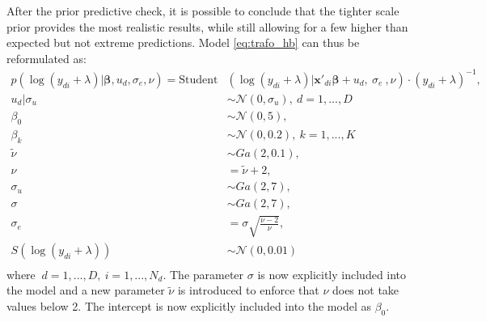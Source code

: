After the prior predictive check, it is possible to conclude that the tighter scale prior provides the most realistic results, while still allowing for a few higher than expected but not extreme predictions.
Model \ref{eq:trafo_hb} can thus be reformulated as:
\begin{equation}
    \begin{split}
        p(\log(y_{di} + \lambda) |\boldsymbol \beta, u_d, \sigma_e, \nu)   =        \text{Student}&(\log(y_{di} + \lambda)| \boldsymbol{x'}_{di} \boldsymbol \beta + u_d,\ \sigma_e\ , \nu)\cdot (y_{di} + \lambda)^{-1}, \\
        u_d | \sigma_u & \sim \mathcal N(0, \sigma_u),\ d = 1, ..., D \\
        \beta_0 & \sim \mathcal N (0, 5),\\
        \beta_k & \sim \mathcal N(0, 0.2),\ k = 1, ..., K\\
        \tilde \nu & \sim Ga(2, 0.1), \\
        \nu & = \tilde \nu + 2,\\
        \sigma_u & \sim Ga(2, 7), \\
        \sigma & \sim Ga(2, 7), \\
        \sigma_e & = \sigma \sqrt{\frac{\nu - 2}{\nu}},\\
        S(\log(y_{di} + \lambda)) & \sim \mathcal N(0, 0.01)\\
    \end{split}
    \label{eq:trafo_coef_var}
\end{equation}
where $\ d = 1, ..., D,\ i = 1, ..., N_d$. The parameter $\sigma$ is now explicitly included into the model and a new parameter $\tilde \nu$ is introduced to enforce that $\nu$ does not take values below 2. The intercept is now explicitly included into the model as $\beta_0$.






